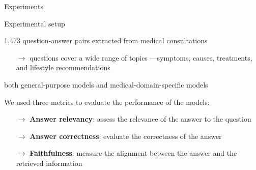 \documentclass[handout]{beamer}\mode<handout>{\usetheme{AMSBolognaFC}}
\begin{document}
\begin{frame}{Experiments}

    \begin{block}{Experimental setup}
        \begin{description}[left=0pt]
            \item[Dataset]  \alert{1,473} question-answer pairs extracted from medical consultations
            \begin{itemize}
                \item[$\rightarrow$] questions cover a wide range of topics ---\alert{symptoms}, \alert{causes}, \alert{treatments}, and \alert{lifestyle recommendations}
            \end{itemize}
            \item[Models]  both general-purpose models and medical-domain-specific models
            \item[Metrics] We used three metrics to evaluate the performance of the models:
            \begin{itemize}
                \item[$\rightarrow$] \textbf{Answer relevancy}: assess the \alert{relevance} of the answer to the question
                \item[$\rightarrow$] \textbf{Answer correctness}: evaluate the \alert{correctness} of the answer
                \item[$\rightarrow$] \textbf{Faithfulness}: measure the \alert{alignment} between the answer and the retrieved information
            \end{itemize}
        \end{description}
    \end{block}

\end{frame}
\end{document}
